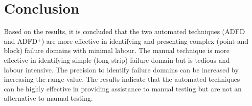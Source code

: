 \documentclass[runningheads,a4paper]{llncs}
\begin{document}






\section{Conclusion} \label{sec:conclusion}
Based on the results, it is concluded that the two automated techniques (ADFD and ADFD$^+$) are more effective in identifying and presenting complex (point and block) failure domains with minimal labour. The manual technique is more effective in identifying simple (long strip) failure domain but is tedious and labour intensive.  The precision to identify failure domains can be increased by increasing the range value. The results indicate that the automated techniques can be highly effective in providing assistance to manual testing but are not an alternative to manual testing.
\end{document}
